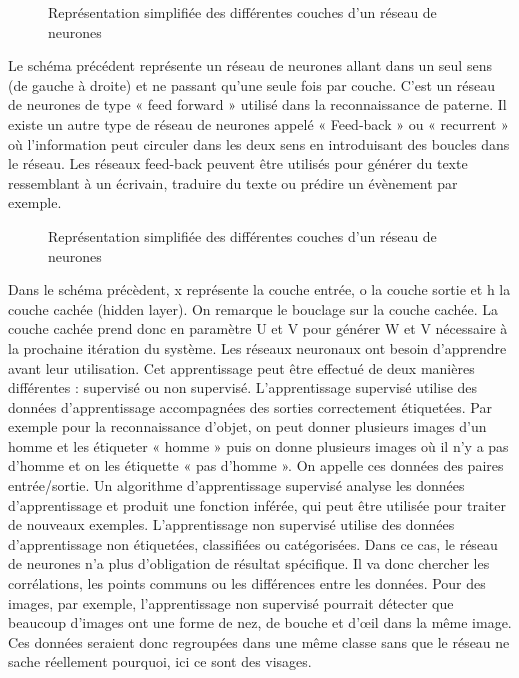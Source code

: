 \documentclass[debug,nodate,hideweeklyreports,noposter]{polytech/polytech}
\begin{document}
\begin{figure}
  \caption{Représentation simplifiée des différentes couches d'un réseau de neurones}
  \label{fig:layerssimpl}
\end{figure}

Le schéma précédent représente un réseau de neurones allant dans un seul sens (de gauche à droite) et ne passant qu’une seule fois par couche. C’est un réseau de neurones de type « feed forward » utilisé dans la reconnaissance de paterne. Il existe un autre type de réseau de neurones appelé « Feed-back » ou « recurrent » où l’information peut circuler dans les deux sens en introduisant des boucles dans le réseau. Les réseaux feed-back peuvent être utilisés pour générer du texte ressemblant à un écrivain, traduire du texte ou prédire un évènement par exemple. 

\begin{figure}
  \caption{Représentation simplifiée des différentes couches d'un réseau de neurones}
  \label{fig:layerscomp}
\end{figure}

Dans le schéma précèdent, x représente la couche entrée, o la couche sortie et h la couche cachée (hidden layer). On remarque le bouclage sur la couche cachée. La couche cachée prend donc en paramètre U et V pour générer W et V nécessaire à la prochaine itération du système.
Les réseaux neuronaux ont besoin d’apprendre avant leur utilisation.  Cet apprentissage peut être effectué de deux manières différentes : supervisé ou non supervisé. 
L’apprentissage supervisé utilise des données d’apprentissage accompagnées des sorties correctement étiquetées. Par exemple pour la reconnaissance d’objet, on peut donner plusieurs images d’un homme et les étiqueter « homme » puis on donne plusieurs images où il n’y a pas d’homme et on les étiquette « pas d’homme ». On appelle ces données des paires entrée/sortie. Un algorithme d'apprentissage supervisé analyse les données d'apprentissage et produit une fonction inférée, qui peut être utilisée pour traiter de nouveaux exemples.
L’apprentissage non supervisé utilise des données d’apprentissage non étiquetées, classifiées ou catégorisées. Dans ce cas, le réseau de neurones n’a plus d’obligation de résultat spécifique. Il va donc chercher les corrélations, les points communs ou les différences entre les données. Pour des images, par exemple, l’apprentissage non supervisé pourrait détecter que beaucoup d’images ont une forme de nez, de bouche et d’œil dans la même image. Ces données seraient donc regroupées dans une même classe sans que le réseau ne sache réellement pourquoi, ici ce sont des visages.
\end{document}
